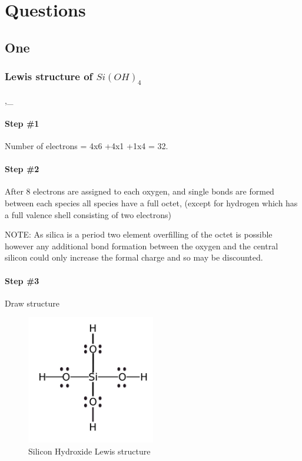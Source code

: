 \documentclass[]{article}
\date{}
\let\oldparagraph\paragraph
\renewcommand{\paragraph}[1]{\oldparagraph{#1}\mbox{}}
\begin{document}
\hypertarget{questions}{%
\section{Questions}\label{questions}}

\hypertarget{one}{%
\subsection{One}\label{one}}

\hypertarget{lewis-structure-of-sioh_4}{%
\subsubsection{\texorpdfstring{Lewis structure of
\(Si(OH)_4\)}{Lewis structure of Si(OH)\_4}}\label{lewis-structure-of-sioh_4}}

,\_

\hypertarget{step-1}{%
\paragraph{Step \#1}\label{step-1}}

Number of electrons = 4x6 +4x1 +1x4 = 32.

\hypertarget{step-2}{%
\paragraph{Step \#2}\label{step-2}}

After 8 electrons are assigned to each oxygen, and single bonds are
formed between each species all species have a full octet, (except for
hydrogen which has a full valence shell consisting of two electrons)

NOTE: As silica is a period two element overfilling of the octet is
possible however any additional bond formation between the oxygen and
the central silicon could only increase the formal charge and so may be
discounted.

\hypertarget{step-3}{%
\paragraph{Step \#3}\label{step-3}}

Draw structure

\begin{figure}
\centering
\includegraphics[width=0.5\textwidth,height=\textheight]{Images/SiliconHydroxideLewisStructure.jpg}
\caption{Silicon Hydroxide Lewis structure}
\end{figure}
\end{document}
